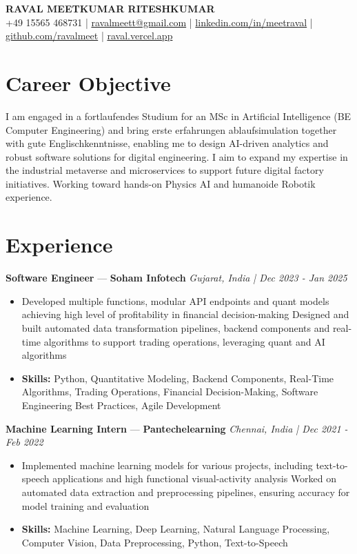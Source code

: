 \documentclass[a4paper,10pt]{article}
\begin{document}
\begin{center}
  {\Large\bfseries RAVAL MEETKUMAR RITESHKUMAR}\\[2pt]
  {\small +49 15565 468731 \;|\; \href{mailto:ravalmeett@gmail.com}{ravalmeett@gmail.com} \;|\; \href{https://www.linkedin.com/in/meetraval/}{linkedin.com/in/meetraval} \;|\; \href{https://github.com/ravalmeet}{github.com/ravalmeet} \;|\; \href{https://raval.vercel.app/}{raval.vercel.app}}
\end{center}
\vspace{-3pt}

\section*{Career Objective}
I am engaged in a fortlaufendes Studium for an MSc in Artificial Intelligence (BE Computer Engineering) and bring erste erfahrungen ablaufsimulation together with gute Englischkenntnisse, enabling me to design AI-driven analytics and robust software solutions for digital engineering. I aim to expand my expertise in the industrial metaverse and microservices to support future digital factory initiatives. Working toward hands-on Physics AI and humanoide Robotik experience.\par

\section*{Experience}
\textbf{Software Engineer} — \textbf{Soham Infotech} \hfill \textit{Gujarat, India \;|\; Dec 2023 - Jan 2025}\par
\vspace{1pt}
\begin{itemize}
  \item Developed multiple functions, modular API endpoints and quant models achieving high level of profitability in financial decision-making Designed and built automated data transformation pipelines, backend components and real-time algorithms to support trading operations, leveraging quant and AI algorithms
  \item \textbf{Skills:} Python, Quantitative Modeling, Backend Components, Real-Time Algorithms, Trading Operations, Financial Decision-Making, Software Engineering Best Practices, Agile Development
\end{itemize}
\vspace{3pt}
\textbf{Machine Learning Intern} — \textbf{Pantechelearning} \hfill \textit{Chennai, India \;|\; Dec 2021 - Feb 2022}\par
\vspace{1pt}
\begin{itemize}
  \item Implemented machine learning models for various projects, including text-to-speech applications and high functional visual-activity analysis Worked on automated data extraction and preprocessing pipelines, ensuring accuracy for model training and evaluation
  \item \textbf{Skills:} Machine Learning, Deep Learning, Natural Language Processing, Computer Vision, Data Preprocessing, Python, Text-to-Speech
\end{itemize}
\end{document}
